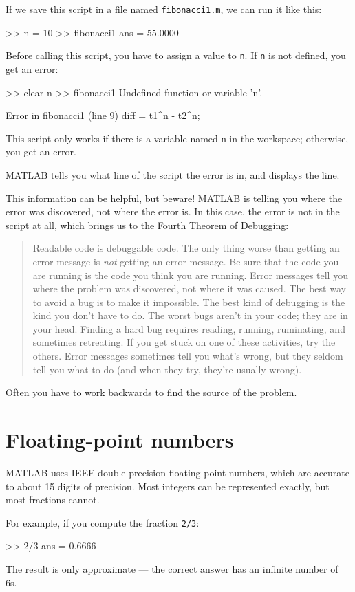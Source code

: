 \documentclass[
]{book}
\numberwithin{Answer}{chapter}
\numberwithin{Exercise}{chapter}
\newcommand{\displaythrm}[1]{%
    \ifthenelse{\equal{#1}{1}}%
        {Readable code is debuggable code.}{%
    \ifthenelse{\equal{#1}{2}}%
        {The only thing worse than getting an error message is {\em
         not} getting an error message.}{%
    \ifthenelse{\equal{#1}{3}}%
        {Be sure that the code you are running
         is the code you think you are running.}{%
    \ifthenelse{\equal{#1}{4}}%
        {Error messages tell you where the problem was discovered,
         not where it was caused.}{%
    \ifthenelse{\equal{#1}{5}}%
        {The best way to avoid a bug is to make it impossible.}{%
    \ifthenelse{\equal{#1}{6}}%
        {The best kind of debugging is the kind you don't have to do.}{%
    \ifthenelse{\equal{#1}{7}}%
        {The worst bugs aren't in your code; they are in your head.}{%
    \ifthenelse{\equal{#1}{8}}%
        {Finding a hard bug requires reading, running, ruminating,
         and sometimes retreating.  If you get stuck on one of these
         activities, try the others.}{%
    \ifthenelse{\equal{#1}{9}}%
        {Error messages sometimes tell you what's wrong, but they
         seldom tell you what to do (and when they try, they're usually
         wrong).}{%
    {}%
}}}}}}}}}}%
\begin{document}

If we save this script in a file named {\tt fibonacci1.m}, we can run it like this:

\begin{code}
>> n = 10
>> fibonacci1
ans = 55.0000
\end{code}

Before calling this script, you have to assign a value to {\tt n}.
If {\tt n} is not defined, you get an error:

\begin{code}
>> clear n
>> fibonacci1
Undefined function or variable 'n'.

Error in fibonacci1 (line 9)
diff = t1^n - t2^n;
\end{code}

This script only works if there is a variable named {\tt n} in the workspace; otherwise, you get an error.


MATLAB tells you what line of the script the error is in, and displays the line.


This information can be helpful, but beware!  MATLAB is telling you
where the error was discovered, not where the error is.  In this
case, the error is not in the script at all, which brings us to the Fourth Theorem of Debugging:

\begin{quote}
\displaythrm{4}
\end{quote}

Often you have to work backwards to find the source of the problem.


\section{Floating-point numbers}

MATLAB uses IEEE double-precision floating-point numbers, which are accurate to about 15 digits of precision.  Most integers can be represented exactly, but most fractions cannot.


For example, if you compute the fraction {\tt 2/3}:

\begin{code}
>> 2/3
ans = 0.6666
\end{code}

The result is only approximate --- the correct answer has an infinite number of 6s. 
\end{document}
